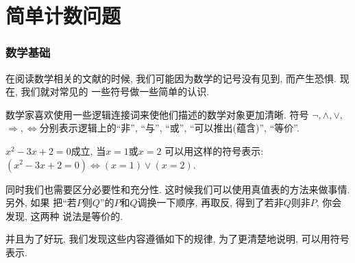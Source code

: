 \part{简单计数问题}

\section{数学基础} 

在阅读数学相关的文献的时候, 我们可能因为数学的记号没有见到, 而产生恐惧. 现在, 我们就对常见的
一些符号做一些简单的认识. 

 数学家喜欢使用一些逻辑连接词来使他们描述的数学对象更加清晰. 符号
$\lnot, \land, \lor,$ $\Rightarrow, \Leftrightarrow$分别表示逻辑上的``非'', ``与'',
``或'', ``可以推出(蕴含)'', ``等价''. 

\begin{example}
    $x^2-3x+2=0$成立, 当$x=1$或$x=2$
    可以用这样的符号表示: $(x^2-3x+2=0) \Leftrightarrow (x=1) \lor (x=2)$. 
\end{example}

同时我们也需要区分必要性和充分性. 这时候我们可以使用真值表的方法来做事情. 另外, 如果
把``若$P$则$Q$''的$P$和$Q$调换一下顺序, 再取反, 得到了$若非Q则非P$, 你会发现, 这两种
说法是等价的. 

并且为了好玩, 我们发现这些内容遵循如下的规律, 为了更清楚地说明, 可以用符号表示. 

